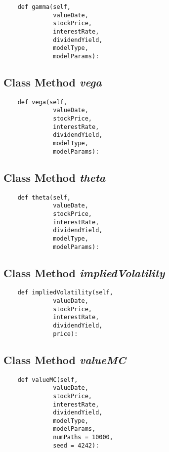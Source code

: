 \documentclass[twoside,11pt]{book}
\begin{document}
\begin{lstlisting}
    def gamma(self,
              valueDate,
              stockPrice,
              interestRate,
              dividendYield,
              modelType,
              modelParams):
\end{lstlisting}

\subsection{Class Method {\it vega}}


\begin{lstlisting}
    def vega(self,
              valueDate,
              stockPrice,
              interestRate,
              dividendYield,
              modelType,
              modelParams):
\end{lstlisting}

\subsection{Class Method {\it theta}}


\begin{lstlisting}
    def theta(self,
              valueDate,
              stockPrice,
              interestRate,
              dividendYield,
              modelType,
              modelParams):
\end{lstlisting}

\subsection{Class Method {\it impliedVolatility}}


\begin{lstlisting}
    def impliedVolatility(self,
              valueDate,
              stockPrice,
              interestRate,
              dividendYield,
              price):
\end{lstlisting}

\subsection{Class Method {\it valueMC}}


\begin{lstlisting}
    def valueMC(self,
              valueDate,
              stockPrice,
              interestRate,
              dividendYield,
              modelType, 
              modelParams,
              numPaths = 10000,
              seed = 4242):
\end{lstlisting}
\end{document}
